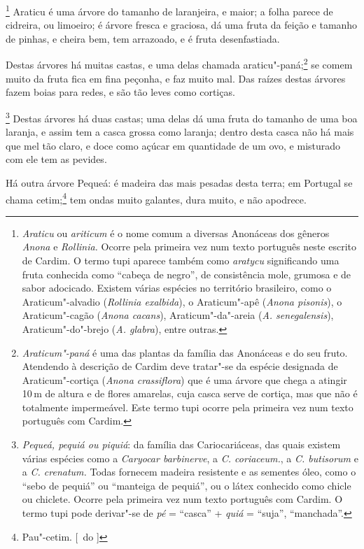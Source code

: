 \begin{linenumbers}
\footnote{ \textit{Araticu} ou \textit{ariticum} é o
nome comum a diversas Anonáceas dos gêneros \textit{Anona} e 
\textit{Rollinia.} Ocorre pela primeira vez num texto português neste
escrito de Cardim. O termo tupi aparece também como \textit{aratycu}
significando uma fruta conhecida como ``cabeça de negro'', de
consistência mole, grumosa e de sabor adocicado. Existem várias
espécies no território brasileiro, como o Araticum"-alvadio
(\textit{Rollinia exalbida}), o Araticum"-apê (\textit{Anona pisonis}), 
o Araticum"-cagão (\textit{Anona cacans}), Araticum"-da"-areia
(\textit{A. senegalensis}), Araticum"-do"-brejo (\textit{A. glabra}), 
entre outras.} Araticu é uma árvore do tamanho de
laranjeira, e maior; a folha parece de cidreira, ou limoeiro; é árvore
fresca e graciosa, dá uma fruta da feição e tamanho de pinhas, e cheira
bem, tem arrazoado, e é fruta desenfastiada.

 Destas árvores há muitas castas, e uma delas chamada 
araticu"-paná;\footnote{ \textit{Araticum"-paná} é uma das plantas da família das
Anonáceas e do seu fruto. Atendendo à descrição de Cardim deve
tratar"-se da espécie designada de Araticum"-cortiça (\textit{Anona
crassiflora}) que é uma árvore que chega a atingir 10\,m de altura e de
flores amarelas, cuja casca serve de cortiça, mas que não é totalmente
impermeável. Este termo tupi ocorre pela primeira vez num texto
português com Cardim.} se comem muito da fruta fica em fina peçonha, e
faz muito mal. Das raízes destas árvores fazem boias para redes, e são
tão leves como cortiças.

\footnote{ \textit{Pequeá, pequiá ou piquiá}: da
família das Cariocariáceas, das quais existem várias espécies como a 
\textit{Caryocar barbinerve}, a \textit{C. coriaceum.}, a \textit{C.
butisorum} e a \textit{C. crenatum.} Todas fornecem madeira resistente
e as sementes óleo, como o ``sebo de pequiá'' ou ``manteiga de pequiá'', ou
o látex conhecido como chicle ou chiclete. Ocorre pela primeira vez num
texto português com Cardim. O termo tupi pode derivar"-se de \textit{pé} = 
``casca'' + \textit{quiá} = ``suja'', ``manchada''.} Destas
árvores há duas castas; uma delas dá uma fruta do tamanho de uma boa
laranja, e assim tem a casca grossa como laranja; dentro desta casca
não há mais que mel tão claro, e doce como açúcar em quantidade de um
ovo, e misturado com ele tem as pevides.

 Há outra árvore Pequeá: é madeira das mais pesadas desta terra; em
Portugal se chama cetim;\footnote{ Pau"-cetim. [~do ]} tem ondas muito galantes, dura muito, e não
apodrece.


\end{linenumbers}
